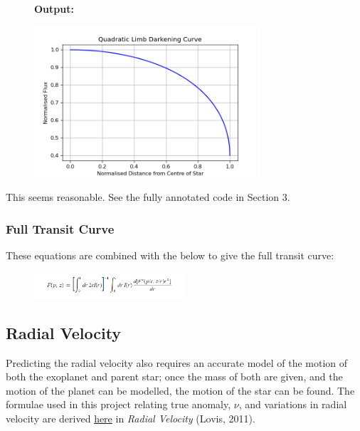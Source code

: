 \documentclass[11pt]{article}
\newcommand*{\figuretitle}[1]{
    	{\textbf{#1}
    	\par\vspace{-1em}}
    }
\begin{document}
\begin{figure}[H]
	\figuretitle{Output:}
	\centering
	\includegraphics[width=0.75\textwidth]{../matplotlib_graphs/limb_darkening.png}
\end{figure}    
    
This seems reasonable. See the fully annotated code in Section 3.

    \hypertarget{full-transit-curve}{%
\subsubsection{Full Transit Curve}\label{full-transit-curve}}

These equations are combined with the below to give the full transit
curve:

\begin{figure}[!ht]
	\centering
	\includegraphics[width=0.5\textwidth]{../images/flux_eq.png}
	\label{Figure 2.f}
\end{figure}

    \hypertarget{radial-velocity}{%
\subsection{Radial Velocity}\label{radial-velocity}}

Predicting the radial velocity also requires an accurate model of the
motion of both the exoplanet and parent star; once the mass of both are given, and the motion of the planet can be modelled, the motion of the star can be found. The formulae used in this project relating true anomaly, \(\nu\), and variations in radial velocity are derived \href{http://exoplanets.astro.yale.edu/workshop/EPRV/Bibliography_files/Radial_Velocity.pdf}{here} in \emph{Radial Velocity} (Lovis, 2011).
\end{document}
